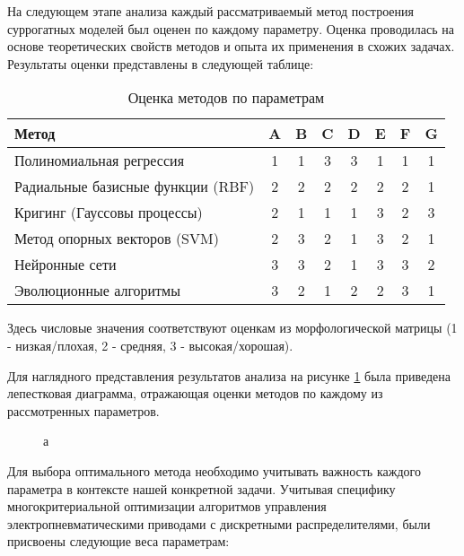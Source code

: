 На следующем этапе анализа каждый рассматриваемый метод
построения суррогатных моделей был оценен по каждому параметру.
Оценка проводилась на основе теоретических свойств методов и опыта
их применения в схожих задачах. Результаты оценки представлены в следующей таблице:

\begin{table}[h]
    \centering
    \caption{Оценка методов по параметрам}
    \begin{tabular}{l|c|c|c|c|c|c|c}
        \midrule
        Метод                             & A & B & C & D & E & F & G \\
        \midrule
        Полиномиальная регрессия          & 1 & 1 & 3 & 3 & 1 & 1 & 1 \\
        \hline
        Радиальные базисные функции (RBF) & 2 & 2 & 2 & 2 & 2 & 2 & 1 \\
        \hline
        Кригинг (Гауссовы процессы)       & 2 & 1 & 1 & 1 & 3 & 2 & 3 \\
        \hline
        Метод опорных векторов (SVM)      & 2 & 3 & 2 & 1 & 3 & 2 & 1 \\
        \hline
        Нейронные сети                    & 3 & 3 & 2 & 1 & 3 & 3 & 2 \\
        \hline
        Эволюционные алгоритмы            & 3 & 2 & 1 & 2 & 2 & 3 & 1 \\
        \midrule
    \end{tabular}
    \label{tab:method_evaluation}
\end{table}

Здесь числовые значения соответствуют оценкам из
морфологической матрицы (1 - низкая/плохая, 2 - средняя, 3 - высокая/хорошая).

Для наглядного представления результатов анализа на рисунке \ref{fig:morphological_analysis}
была приведена лепестковая диаграмма, отражающая оценки методов по каждому из
рассмотренных параметров.

\begin{figure}[ht]
    \caption{а}\label{fig:morphological_analysis}
\end{figure}

Для выбора оптимального метода необходимо учитывать важность
каждого параметра в контексте нашей конкретной задачи.
Учитывая специфику многокритериальной оптимизации алгоритмов
управления электропневматическими приводами с дискретными
распределителями, были присвоены следующие веса параметрам:

